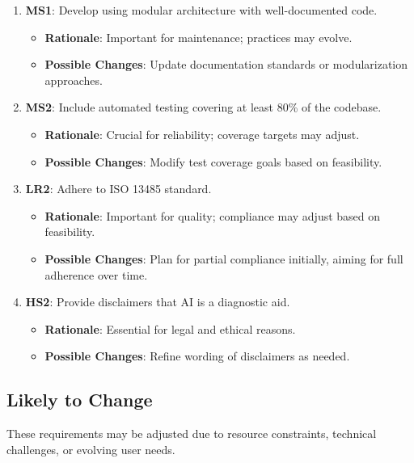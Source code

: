 \documentclass[12pt]{article}
\begin{document}
\begin{enumerate}[resume]
    \item \textbf{MS1}: Develop using modular architecture with well-documented code.
    \begin{itemize}[label=-]
        \item \textbf{Rationale}: Important for maintenance; practices may evolve.
        \item \textbf{Possible Changes}: Update documentation standards or modularization approaches.
    \end{itemize}

    \item \textbf{MS2}: Include automated testing covering at least 80\% of the codebase.
    \begin{itemize}[label=-]
        \item \textbf{Rationale}: Crucial for reliability; coverage targets may adjust.
        \item \textbf{Possible Changes}: Modify test coverage goals based on feasibility.
    \end{itemize}

    \item \textbf{LR2}: Adhere to ISO 13485 standard.
    \begin{itemize}[label=-]
        \item \textbf{Rationale}: Important for quality; compliance may adjust based on feasibility.
        \item \textbf{Possible Changes}: Plan for partial compliance initially, aiming for full adherence over time.
    \end{itemize}

    \item \textbf{HS2}: Provide disclaimers that AI is a diagnostic aid.
    \begin{itemize}[label=-]
        \item \textbf{Rationale}: Essential for legal and ethical reasons.
        \item \textbf{Possible Changes}: Refine wording of disclaimers as needed.
    \end{itemize}
\end{enumerate}

\subsection{Likely to Change}

These requirements may be adjusted due to resource constraints, technical challenges, or evolving user needs.
\end{document}
